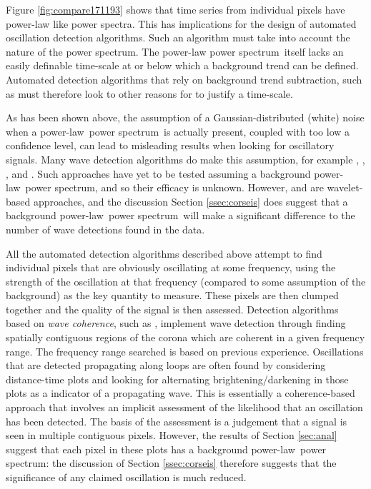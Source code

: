\documentclass{aastex}
\newcommand{\PS}{power spectrum}
\newcommand{\PL}{power-law}
\begin{document}
Figure \ref{fig:compare171193} shows that time series from individual
pixels have power-law like power spectra.  This has implications for
the design of automated oscillation detection algorithms.  Such an
algorithm must take into account the nature of the \PS.  The power-law
\PS\ itself lacks an easily definable time-scale at or below which a
background trend can be defined.  Automated detection algorithms that
rely on background trend subtraction, such as
\cite{2010SoPh..264..403I} must therefore look to other reasons for to
justify a time-scale.

As has been shown above, the assumption of a Gaussian-distributed
(white) noise when a \PL\ \PS\ is actually present, coupled with too
low a confidence level, can lead to misleading results when looking
for oscillatory signals.  Many wave detection algorithms do make this
assumption, for example \cite{2004SoPh..223....1D},
\cite{2007SoPh..241..397N}, \cite{2008SoPh..248..395S},
\cite{2010SoPh..264..403I} and \cite{2013SoPh..286..405C}.  Such
approaches have yet to be tested assuming a background \PL\ \PS, and
so their efficacy is unknown.  However, \cite{2004SoPh..223....1D} and
\cite{2008SoPh..248..395S} are wavelet-based approaches, and the
discussion Section \ref{ssec:corseis} does suggest that a background
\PL\ \PS\ will make a significant difference to the number of wave
detections found in the data.

All the automated detection algorithms described above attempt to find
individual pixels that are obviously oscillating at some frequency,
using the strength of the oscillation at that frequency (compared to
some assumption of the background) as the key quantity to measure.
These pixels are then clumped together and the quality of the signal
is then assessed.  Detection algorithms based on {\it wave coherence},
such as \cite{2008SoPh..252..321M}, implement wave detection through
finding spatially contiguous regions of the corona which are coherent
in a given frequency range.  The frequency range searched is based on
previous experience.  Oscillations that are detected propagating along
loops are often found by considering distance-time plots
\citep{2000AA...355L..23D, 2003AA...404L...1K} and looking for
alternating brightening/darkening in those plots as a indicator of a
propagating wave.  This is essentially a coherence-based approach that
involves an implicit assessment of the likelihood that an oscillation
has been detected.  The basis of the assessment is a judgement that a
signal is seen in multiple contiguous pixels.  However, the results of
Section \ref{sec:anal} suggest that each pixel in these plots has a
background \PL\ \PS: the discussion of Section \ref{ssec:corseis}
therefore suggests that the significance of any claimed oscillation is
much reduced.
\end{document}
